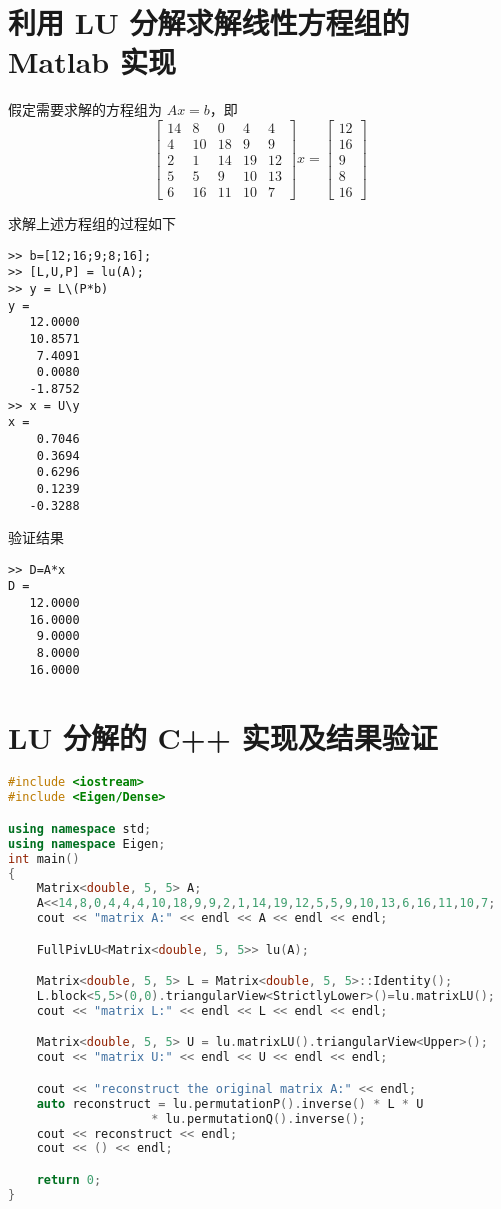 \section{利用 LU 分解求解线性方程组的 Matlab 实现}
假定需要求解的方程组为 $Ax=b$，即
\begin{equation}
    \begin{bmatrix}
        14 & 8  & 0  & 4  & 4  \\
        4  & 10 & 18 & 9  & 9  \\
        2  & 1  & 14 & 19 & 12 \\
        5  & 5  & 9  & 10 & 13 \\
        6  & 16 & 11 & 10 & 7
    \end{bmatrix}
    x = 
    \begin{bmatrix}
        12 \\ 16 \\ 9 \\ 8 \\ 16
    \end{bmatrix}
\end{equation}

求解上述方程组的过程如下
\begin{lstlisting}
>> b=[12;16;9;8;16];
>> [L,U,P] = lu(A);
>> y = L\(P*b)
y =
   12.0000
   10.8571
    7.4091
    0.0080
   -1.8752
>> x = U\y
x =
    0.7046
    0.3694
    0.6296
    0.1239
   -0.3288
\end{lstlisting}

验证结果
\begin{lstlisting}
>> D=A*x
D =
   12.0000
   16.0000
    9.0000
    8.0000
   16.0000
\end{lstlisting}


\section{LU 分解的 C++ 实现及结果验证}
\begin{lstlisting}[language=C++]
#include <iostream>
#include <Eigen/Dense>

using namespace std;
using namespace Eigen;
int main()
{
    Matrix<double, 5, 5> A;
    A<<14,8,0,4,4,4,10,18,9,9,2,1,14,19,12,5,5,9,10,13,6,16,11,10,7;
    cout << "matrix A:" << endl << A << endl << endl;

    FullPivLU<Matrix<double, 5, 5>> lu(A);

    Matrix<double, 5, 5> L = Matrix<double, 5, 5>::Identity();
    L.block<5,5>(0,0).triangularView<StrictlyLower>()=lu.matrixLU();
    cout << "matrix L:" << endl << L << endl << endl;

    Matrix<double, 5, 5> U = lu.matrixLU().triangularView<Upper>();
    cout << "matrix U:" << endl << U << endl << endl;

    cout << "reconstruct the original matrix A:" << endl;
    auto reconstruct = lu.permutationP().inverse() * L * U
                    * lu.permutationQ().inverse();
    cout << reconstruct << endl;
    cout << () << endl;

    return 0;
}
\end{lstlisting}

